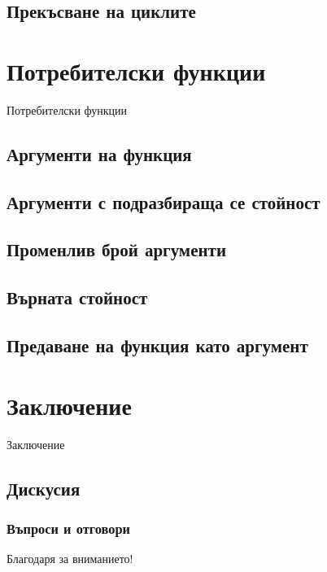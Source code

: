 \documentclass{beamer}
\begin{document}
\subsection{Прекъсване на циклите}

\section{Потребителски функции}

\begin{frame}
\center \huge{Потребителски функции}
\end{frame}

\subsection{Аргументи на функция}

\subsection{Аргументи с подразбираща се стойност}

\subsection{Променлив брой аргументи}

\subsection{Върната стойност}

\subsection{Предаване на функция като аргумент}

\section{Заключение}

\begin{frame}
\center \huge{Заключение}
\end{frame}

\subsection{Дискусия}

\begin{frame}
\frametitle{Въпроси и отговори}
\center \huge{Благодаря за вниманието!}
\end{frame}
\end{document}

